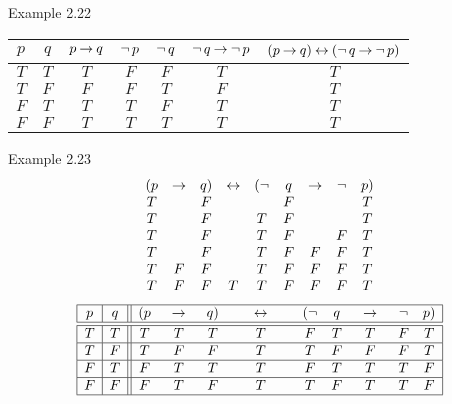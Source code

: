 \documentclass[style=simple,size=12pt]{powerdot}
\begin{document}
\begin{wideslide}{Example 2.22}
\begin{center}
\begin{tabular}{|c|c||c|c|c|c|c|}
\hline
$p$ & $q$ & $p \mathbin{\rightarrow} q$ & $\mathop{\neg} p$ & $\mathop{\neg} q$ 
& $\mathop{\neg} q \mathbin{\rightarrow} \mathop{\neg} p$ & $(p\mathbin{\rightarrow} q)\mathbin{\leftrightarrow}  (\mathop{\neg} q\mathbin{\rightarrow} \mathop{\neg} p)$\\ \hline \hline
$T$ & $T$ & $T$  & $F$ & $F$  & $T$ & $T$  \\ \hline
$T$ & $F$ & $F$ & $F$ & $T$  & $F$ & $T$   \\ \hline
$F$ & $T$ & $T$ & $T$ & $F$  & $T$ & $T$   \\ \hline
$F$ & $F$ & $T$ & $T$ & $T$  & $T$ & $T$   \\ \hline
\end{tabular}
\end{center}
\end{wideslide}

\begin{wideslide}[bm=,toc=]{Example 2.23}
\vspace*{-2ex}
\begin{displaymath}
\begin{array}{ccccccccc}
(p & \mathbin{\rightarrow} & q) & \mathbin{\leftrightarrow} & (\mathop{\neg} & q & \mathbin{\rightarrow} & \mathop{\neg} & p)\\
T  &      & F  &      &       & F &      &      & T\\
T  &      & F  &      &   T    & F &      &      & T\\
T  &      & F  &      &   T    & F &      &  F    & T\\
T  &      & F  &      &   T    & F &   F   & F     & T\\
T  &   F  & F  &      &   T    & F &   F   & F     & T\\
T  &   F  & F  &   T  &   T    & F &   F   & F     & T\\
\end{array}   
\end{displaymath}
\vspace*{-2ex}
\begin{displaymath}
\begin{array}{|c|c||c@{\hspace{1.5em}}c@{\hspace{1.5em}}c @{\hspace{2.5em}} c @{\hspace{2.5em}} cc @{\hspace{1.5em}} c @{\hspace{1.5em}} cc|}
\hline
p & q & (p & \imp & q) & \eqv & (\ngg & q & \imp & \ngg & p)\\\hline\hline
T & T & T  &    T & T  &  T   &    F  & T &  T  &   F  & T\\\hline
T & F & T  &    F & F  &  T   &    T  & F &  F   &   F  & T\\\hline
F & T & F  &    T & T  &  T   &    F  & T &  T   &   T  & F\\\hline
F & F & F  &    T & F  &  T   &    T  & F &  T   &   T  & F\\\hline
\end{array}   
\end{displaymath}
\end{wideslide}
\end{document}
